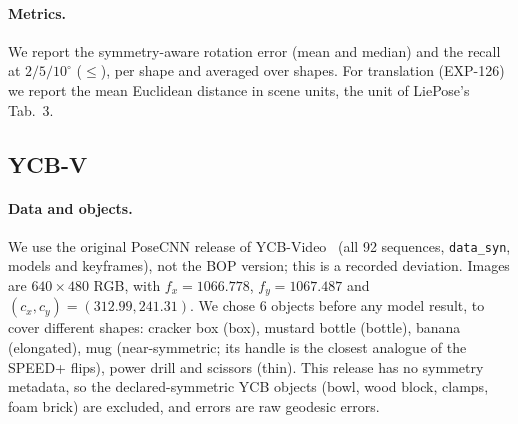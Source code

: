 \paragraph{Metrics.}
We report the symmetry-aware rotation error (mean and median) and the recall at $2/5/10^\circ$ ($\le$), per shape and averaged over shapes. For translation (EXP-126) we report the mean Euclidean distance in scene units, the unit of LiePose's Tab.~3.

\subsection{YCB-V}\label{app:ycbv}

\paragraph{Data and objects.}
We use the original PoseCNN release of YCB-Video~\cite{xiang2018posecnn} (all 92 sequences, \texttt{data\_syn}, models and keyframes), not the BOP version; this is a recorded deviation. Images are $640\times480$ RGB, with $f_x=1066.778$, $f_y=1067.487$ and $(c_x,c_y)=(312.99,241.31)$.
We chose 6 objects before any model result, to cover different shapes: cracker box (box), mustard bottle (bottle), banana (elongated), mug (near-symmetric; its handle is the closest analogue of the SPEED+ flips), power drill and scissors (thin). This release has no symmetry metadata, so the declared-symmetric YCB objects (bowl, wood block, clamps, foam brick) are excluded, and errors are raw geodesic errors.

